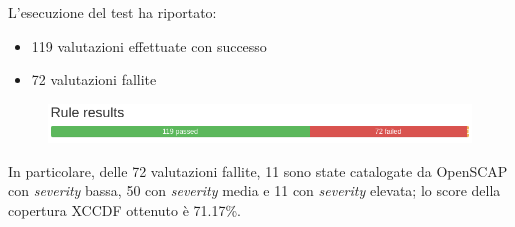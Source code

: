 \documentclass[../main.tex]{subfiles}
\begin{document}
L'esecuzione del test ha riportato:
\begin{itemize}
    \item 119 valutazioni effettuate con successo
    \item 72 valutazioni fallite
\end{itemize}
\begin{figure}[H]
    \centering
    \includegraphics[width=15cm]{immagini/test_oscap_1.png}
\end{figure}

In particolare, delle 72 valutazioni fallite, 11 sono state catalogate da OpenSCAP con \textit{severity} bassa, 50 con \textit{severity} media e 11 con \textit{severity} elevata; lo score della copertura XCCDF ottenuto è 71.17\%.
\end{document}
